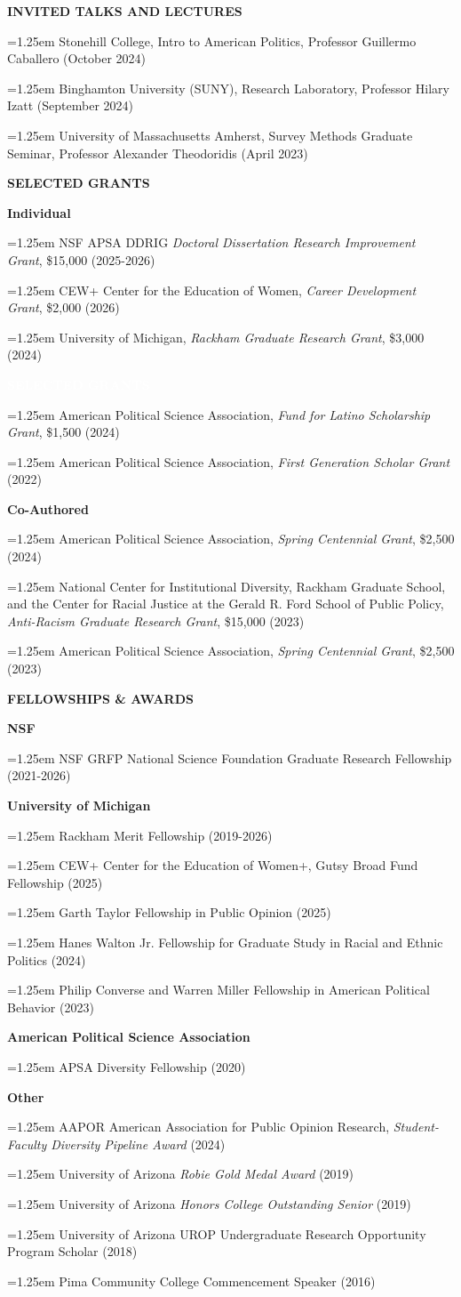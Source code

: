 \documentclass[11pt]{article}
\newlength{\leftcol}
\newlength{\rightcol}
\newcommand{\cvsection}[2]{%
\vspace{1.2em}
\noindent
\begin{minipage}[t]{\leftcol}
\raggedright \bfseries #1
\end{minipage}
\hspace{0.35in}
\begin{minipage}[t]{\rightcol}
#2
\end{minipage}
\par
}
\newcommand{\entry}[1]{%
\hangindent=1.25em
\hangafter=1
#1\par\vspace{0.35em}
}
\newcommand{\subhead}[1]{%
\textbf{#1}\par\vspace{0.25em}
}
\begin{document}
\cvsection{INVITED TALKS AND LECTURES}{
\entry{Stonehill College, Intro to American Politics, Professor Guillermo Caballero (October 2024)}

\entry{Binghamton University (SUNY), Research Laboratory, Professor Hilary Izatt (September 2024)}

\entry{University of Massachusetts Amherst, Survey Methods Graduate Seminar, Professor Alexander Theodoridis (April 2023)}
}
\vspace{0.45em}

\cvsection{SELECTED GRANTS}{

\subhead{Individual}
\entry{NSF APSA DDRIG \textit{Doctoral Dissertation Research Improvement Grant}, \$15,000 (2025-2026)} 
\entry{CEW+ Center for the Education of Women, \textit{Career Development Grant}, \$2,000 (2026)}
\entry{University of Michigan, \textit{Rackham Graduate Research Grant}, \$3,000 (2024)}
}

\cvsection{\textcolor{white}{SELECTED GRANTS}}{
\entry{American Political Science Association, \textit{Fund for Latino Scholarship Grant}, \$1,500 (2024)}
\entry{American Political Science Association, \textit{First Generation Scholar Grant} (2022)}

\subhead{Co-Authored}
\entry{American Political Science Association, \textit{Spring Centennial Grant}, \$2,500 (2024)}
\entry{National Center for Institutional Diversity, Rackham Graduate School, and the Center for Racial Justice at the Gerald R. Ford School of Public Policy, \textit{Anti-Racism Graduate Research Grant}, \$15,000 (2023)}

\entry{American Political Science Association, \textit{Spring Centennial Grant}, \$2,500 (2023)}
}
\vspace{0.45em}

\cvsection{FELLOWSHIPS \& AWARDS}{
\subhead{NSF}
\entry{NSF GRFP National Science Foundation Graduate Research Fellowship (2021-2026)}
\vspace{0.35em}

\subhead{University of Michigan}
\entry{Rackham Merit Fellowship (2019-2026)}
\entry{CEW+ Center for the Education of Women+, Gutsy Broad Fund Fellowship (2025)}
\entry{Garth Taylor Fellowship in Public Opinion (2025)}
\entry{Hanes Walton Jr. Fellowship for Graduate Study in Racial and Ethnic Politics (2024)}
\entry{Philip Converse and Warren Miller Fellowship in American Political Behavior (2023)}
\vspace{0.35em}

\subhead{American Political Science Association}
\entry{APSA Diversity Fellowship (2020)}

\subhead{Other}
\entry{AAPOR American Association for Public Opinion Research, \textit{Student-Faculty Diversity Pipeline Award} (2024)}

\entry{University of Arizona \textit{Robie Gold Medal Award} (2019)}

\entry{University of Arizona \textit{Honors College Outstanding Senior} (2019)}

\entry{University of Arizona UROP Undergraduate Research Opportunity Program Scholar (2018)}

\entry{Pima Community College Commencement Speaker (2016)}
}
\vspace{0.45em}
\end{document}
